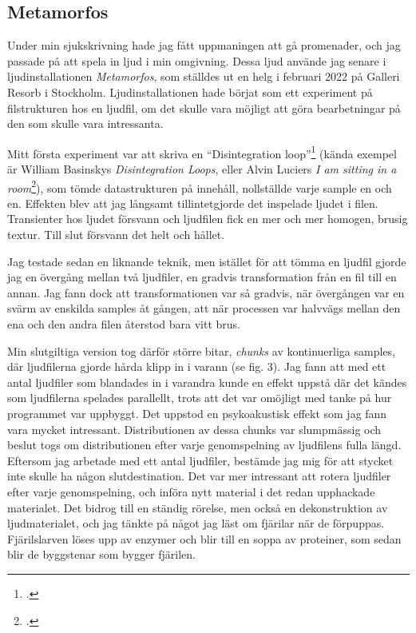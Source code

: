 \documentclass{article}
\begin{document}
\subsection{Metamorfos}\nocite{META}
Under min sjukskrivning hade jag fått uppmaningen att gå promenader, och jag passade på att spela in ljud i
min omgivning. Dessa ljud använde jag senare i ljudinstallationen \emph{Metamorfos}, som ställdes ut en helg i
februari 2022 på Galleri Resorb i Stockholm. Ljudinstallationen hade börjat som ett experiment på
filstrukturen hos en ljudfil, om det skulle vara möjligt att göra bearbetningar på den som skulle vara
intressanta. 

Mitt första experiment var att skriva en ``Disintegration loop''\footcite{Basinski} (kända
exempel är William Basinskys \emph{Disintegration Loops}, eller Alvin Luciers \emph{I am sitting in a
room}\footcite{Lucier}), som tömde datastrukturen på innehåll, nollställde varje sample en och en. Effekten
blev att jag långsamt tillintetgjorde det inspelade ljudet i filen. Transienter hos ljudet försvann och
ljudfilen fick en mer och mer homogen, brusig textur. Till slut försvann det helt och hållet.

Jag testade sedan en liknande teknik, men istället för att tömma en ljudfil gjorde jag en övergång
mellan två ljudfiler, en gradvis transformation från en fil till en annan. Jag fann dock att
transformationen var så gradvis, när övergången var en svärm av enskilda samples åt gången, att när processen
var halvvägs mellan den ena och den andra filen återstod bara vitt brus.

Min slutgiltiga version tog därför större bitar, \emph{chunks} av kontinuerliga samples, där ljudfilerna gjorde
hårda klipp in i varann (se fig. 3). Jag fann att med ett antal ljudfiler som blandades in i varandra kunde en effekt
uppstå där det kändes som ljudfilerna spelades parallellt, trots att det var omöjligt med tanke på hur
programmet var uppbyggt. Det uppstod en psykoakustisk effekt som jag fann vara mycket intressant.
Distributionen av dessa chunks var slumpmässig och beslut togs om distributionen efter varje genomspelning
av ljudfilens fulla längd. Eftersom jag arbetade med ett antal ljudfiler, bestämde jag mig för att stycket
inte skulle ha någon slutdestination. Det var mer intressant att rotera ljudfiler efter varje genomspelning,
och införa nytt material i det redan upphackade materialet. Det bidrog till en ständig rörelse, men också en
dekonstruktion av ljudmaterialet, och jag tänkte på något jag läst om fjärilar när de förpuppas. Fjärilslarven
löses upp av enzymer och blir till en soppa av proteiner, som sedan blir de byggstenar som bygger fjärilen.
\end{document}
